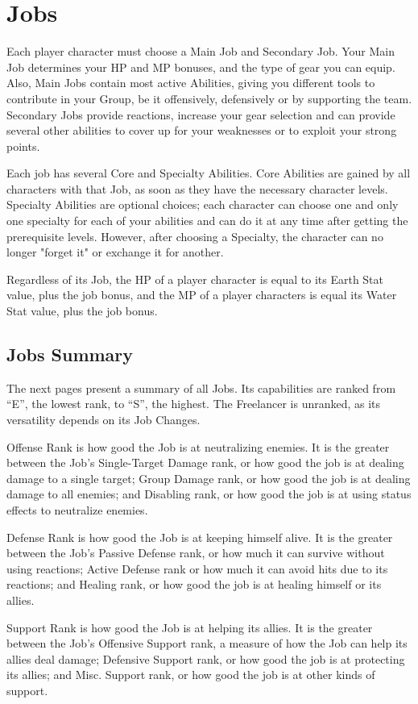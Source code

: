 \section{Jobs}
\begin{multicols}{2}
Each player character must choose a Main
Job and Secondary Job. Your Main Job determines
your HP and MP bonuses, and the type of gear you
can equip. Also, Main Jobs contain most active
Abilities, giving you different tools to contribute in
your Group, be it offensively, defensively or by
supporting the team. Secondary Jobs provide
reactions, increase your gear selection and can
provide several other abilities to cover up for your
weaknesses or to exploit your strong points.

Each job has several Core and Specialty
Abilities. Core Abilities are gained by all characters
with that Job, as soon as they have the necessary
character levels. Specialty Abilities are optional
choices; each character can choose one and only
one specialty for each of your abilities and can do
it at any time after getting the prerequisite levels.
However, after choosing a Specialty, the character
can no longer "forget it" or exchange it for another.

Regardless of its Job, the HP of a player
character is equal to its Earth Stat value, plus the
job bonus, and the MP of a player characters is
equal its Water Stat value, plus the job bonus.

\subsection{Jobs Summary}
The next pages present a summary of all
Jobs. Its capabilities are ranked from “E”, the
lowest rank, to “S”, the highest. The Freelancer is
unranked, as its versatility depends on its Job
Changes.

Offense Rank is how good the Job is at
neutralizing enemies. It is the greater between the
Job's Single-Target Damage rank, or how good the
job is at dealing damage to a single target; Group
Damage rank, or how good the job is at dealing
damage to all enemies; and Disabling rank, or how
good the job is at using status effects to neutralize
enemies.

Defense Rank is how good the Job is at
keeping himself alive. It is the greater between the
Job's Passive Defense rank, or how much it can
survive without using reactions; Active Defense
rank or how much it can avoid hits due to its
reactions; and Healing rank, or how good the job is
at healing himself or its allies.

Support Rank is how good the Job is at
helping its allies. It is the greater between the Job's
Offensive Support rank, a measure of how the Job
can help its allies deal damage; Defensive Support
rank, or how good the job is at protecting its allies;
and Misc. Support rank, or how good the job is at
other kinds of support.
\end{multicols}